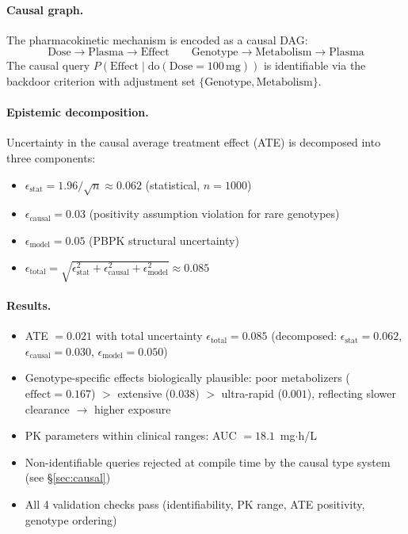 \documentclass[acmsmall,screen,review,anonymous]{acmart}
\newcommand{\eps}{\epsilon}
\begin{document}
\paragraph{Causal graph.}
The pharmacokinetic mechanism is encoded as a causal DAG:
\[
\text{Dose} \to \text{Plasma} \to \text{Effect} \qquad
\text{Genotype} \to \text{Metabolism} \to \text{Plasma}
\]
The causal query $P(\text{Effect} \mid \text{do}(\text{Dose} = 100\,\text{mg}))$
is identifiable via the backdoor criterion with adjustment set
$\{\text{Genotype}, \text{Metabolism}\}$.

\paragraph{Epistemic decomposition.}
Uncertainty in the causal average treatment effect (ATE) is decomposed into
three components:
\begin{itemize}
  \item $\eps_{\text{stat}} = 1.96/\sqrt{n} \approx 0.062$ (statistical, $n = 1000$)
  \item $\eps_{\text{causal}} = 0.03$ (positivity assumption violation for rare genotypes)
  \item $\eps_{\text{model}} = 0.05$ (PBPK structural uncertainty)
  \item $\eps_{\text{total}} = \sqrt{\eps_{\text{stat}}^2 + \eps_{\text{causal}}^2
        + \eps_{\text{model}}^2} \approx 0.085$
\end{itemize}

\paragraph{Results.}
\begin{itemize}
  \item ATE $= 0.021$ with total uncertainty $\eps_{\text{total}} = 0.085$
        (decomposed: $\eps_{\text{stat}} = 0.062$, $\eps_{\text{causal}} = 0.030$,
        $\eps_{\text{model}} = 0.050$)
  \item Genotype-specific effects biologically plausible:
        poor metabolizers ($\text{effect} = 0.167$) $>$ extensive ($0.038$)
        $>$ ultra-rapid ($0.001$), reflecting slower clearance $\to$ higher exposure
  \item PK parameters within clinical ranges: AUC $= 18.1$~mg$\cdot$h/L
  \item Non-identifiable queries rejected at compile time
        by the causal type system (see \S\ref{sec:causal})
  \item All 4 validation checks pass (identifiability, PK range,
        ATE positivity, genotype ordering)
\end{itemize}
\end{document}
